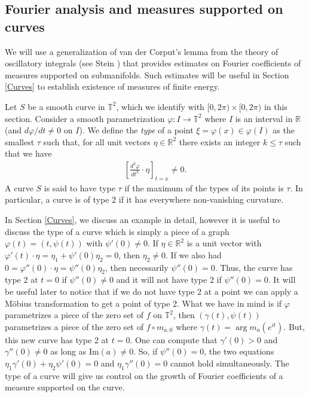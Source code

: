 \documentclass[11 pt,reqno]{amsart}
\theoremstyle{definition}
\theoremstyle{remark}
\numberwithin{equation}{section} \numberwithin{figure}{section}
\begin{document}
\subsection{Fourier analysis and measures supported on curves}\label{ss-oscillatory}
We will use a generalization of van der Corput's lemma from the theory
of oscillatory integrals (see Stein \cite[Section
VIII.3.2]{SteinHarmAnaBook}) that provides estimates on Fourier
coefficients of measures supported on submanifolds. Such estimates
will be useful in Section \ref{Curves} to establish existence of
measures of finite energy.

Let $S$ be a smooth curve
in $\mathbb{T}^2$, which we identify with $[0,2\pi)\times [0,2\pi)$ in
this section. Consider a smooth parametrization
${\varphi}: I\to \mathbb{T}^2$ where $I$ is an interval
in $\mathbb{R}$ (and $d{\varphi}/dt\neq 0$ on $I$). We define the \emph{type} of a point
$\xi={\varphi}(x)\in {\varphi}(I)$ as the smallest $\tau$ such that, for all unit
vectors $\eta\in \mathbb{R}^2$ there exists an integer $k \leq \tau$ such that we have
\begin{align}\label{e-type}
\left[\frac{d^k{\varphi}}{dt^k}\cdot\eta\right]_{t=x} \neq 0.
\end{align}
A curve $S$ is said to have type $\tau$ if the maximum of the types of
its points is $\tau$. In particular, a curve is of type $2$ if it has
everywhere non-vanishing curvature.

In Section \ref{Curves}, we discuss an example in detail, however it
is useful to discuss the type of a curve which is simply a piece of a
graph ${\varphi}(t) = (t, \psi(t))$ with $\psi'(0)\ne 0$.  If $\eta \in
{{\mathbb R}}^2$ is a unit vector with ${\varphi}'(t) \cdot \eta =
\eta_1+\psi'(0)\eta_2 = 0$, then $\eta_2 \ne 0$. If we also had $0 =
{\varphi}''(0) \cdot \eta = \psi''(0) \eta_2$, then necessarily $\psi''(0)
= 0$.  Thus, the curve has type 2 at $t=0$ if $\psi''(0) \ne 0$ and it
will not have type 2 if $\psi''(0) = 0$.  It will be useful later to
notice that if we do not have type 2 at a point we can apply a
M\"obius transformation to get a point of type 2.  What we have in
mind is if ${\varphi}$ parametrizes a piece of the zero set of $f$ on
${{\mathbb T}}^2$, then $(\gamma(t), \psi(t))$ parametrizes a piece of the zero
set of $f \circ m_{a,0}$ where $\gamma(t) = \arg m_a(e^{it})$.  But,
this new curve has type 2 at $t=0$.  One can compute that $\gamma'(0)
>0$ and $\gamma''(0) \ne 0$ as long as $\text{Im}(a) \ne 0$.  So, if
$\psi''(0) = 0$, the two equations $\eta_1 \gamma'(0) + \eta_2
\psi'(0) = 0$ and $\eta_1 \gamma''(0) = 0$ cannot hold simultaneously.
The type of a curve will give us control on the growth of Fourier
coefficients of a measure supported on the curve.
\end{document}

